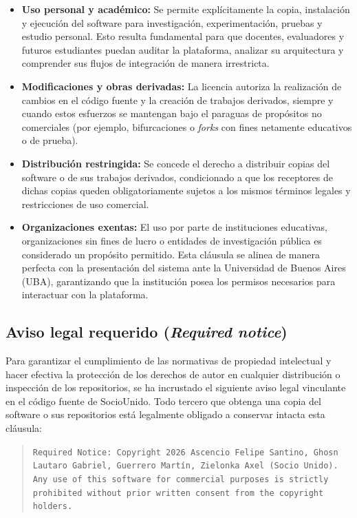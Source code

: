 \begin{itemize}
    \item \textbf{Uso personal y académico:} Se permite explícitamente la copia, instalación y ejecución del software para investigación, experimentación, pruebas y estudio personal. Esto resulta fundamental para que docentes, evaluadores y futuros estudiantes puedan auditar la plataforma, analizar su arquitectura y comprender sus flujos de integración de manera irrestricta.
    \item \textbf{Modificaciones y obras derivadas:} La licencia autoriza la realización de cambios en el código fuente y la creación de trabajos derivados, siempre y cuando estos esfuerzos se mantengan bajo el paraguas de propósitos no comerciales (por ejemplo, bifurcaciones o \textit{forks} con fines netamente educativos o de prueba).
    \item \textbf{Distribución restringida:} Se concede el derecho a distribuir copias del software o de sus trabajos derivados, condicionado a que los receptores de dichas copias queden obligatoriamente sujetos a los mismos términos legales y restricciones de uso comercial.
    \item \textbf{Organizaciones exentas:} El uso por parte de instituciones educativas, organizaciones sin fines de lucro o entidades de investigación pública es considerado un propósito permitido. Esta cláusula se alinea de manera perfecta con la presentación del sistema ante la Universidad de Buenos Aires (UBA), garantizando que la institución posea los permisos necesarios para interactuar con la plataforma.
\end{itemize}

\newpage

\subsection{Aviso legal requerido (\textit{Required notice})}

Para garantizar el cumplimiento de las normativas de propiedad intelectual y hacer efectiva la protección de los derechos de autor en cualquier distribución o inspección de los repositorios, se ha incrustado el siguiente aviso legal vinculante en el código fuente de SocioUnido. Todo tercero que obtenga una copia del software o sus repositorios está legalmente obligado a conservar intacta esta cláusula:

\begin{quote}
    \texttt{Required Notice: Copyright 2026 Ascencio Felipe Santino, Ghosn Lautaro Gabriel, Guerrero Martín, Zielonka Axel (Socio Unido). \\
    Any use of this software for commercial purposes is strictly prohibited without prior written consent from the copyright holders.}
\end{quote}

